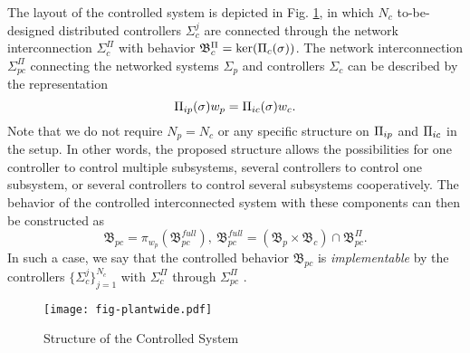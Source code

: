 \documentclass[11pt,print,draftcls,onecolumn,romanappendices]{ieeecolor}
\newcommand{\proj}[2]{\pi_{#1}\left(#2\right)}
\newcommand{\revise}[1]{{\color{black} #1}}
\newcommand{\B}{\mathfrak{B}}
\begin{document}
The layout of the controlled system is depicted in Fig. \ref{fig:fig-plantwide}, in which $N_c$ to-be-designed distributed controllers $\Sigma_c^j$ are connected through the network interconnection $\Sigma_c^\Pi$ with behavior $\B_c^\Pi=\revise{\ker(\Pi_c(\sigma))}$. The network interconnection $\Sigma_{pc}^\Pi$ connecting the networked systems $\Sigma_p$ and controllers $\Sigma_c$ can be described by the representation
\begin{equation}\label{eq:systemcontrollernetwork}
	\Pi_{\revise{ip}}\revise{(\sigma)}w_p=\Pi_{\revise{ic}}\revise{(\sigma)}w_c.
\end{equation}
Note that we do not require $N_p=N_c$ or any specific structure on $\Pi_{\revise{ip}}$ and $\Pi_{\revise{ic}}$ in the setup. In other words, the proposed structure allows the possibilities for one controller to control multiple subsystems, several controllers to control one subsystem, or several controllers to control several subsystems cooperatively. The behavior of the controlled interconnected system with these components can then be constructed as
\begin{equation}
	\B_{pc}=\proj{w_p}{\B_{pc}^{full}}, \ \B_{pc}^{full}=(\B_p\times\B_c)\cap\B_{pc}^\Pi.
\end{equation}
In such a case, we say that the controlled behavior $\B_{pc}$ is \emph{implementable} by the controllers $\{\Sigma_c^j\}_{j=1}^{N_c}$ with $\Sigma_c^\Pi$ through $\Sigma_{pc}^\Pi$ \cite{Yan:2021}.
\begin{figure}
	\centering
	\texttt{[image: fig-plantwide.pdf]}
	\caption{Structure of the Controlled System}
	\label{fig:fig-plantwide}
\end{figure}
\end{document}
